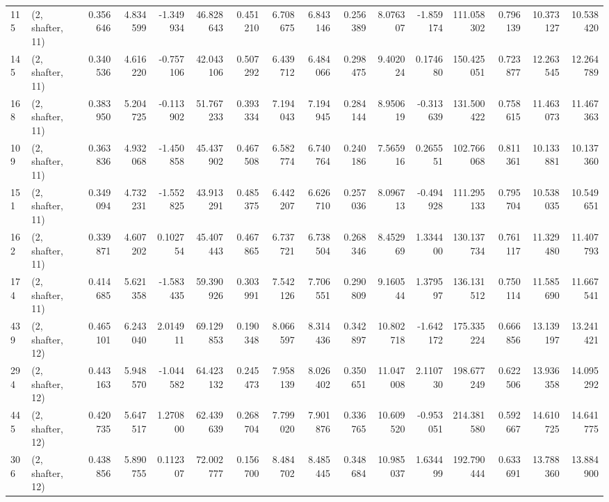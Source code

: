 \begin{tabular}{llrrrrrrrrrrrrrr}
115 &  (2, shafter, 11) &   0.356646 &   4.834599 &  -1.349934 &    46.828643 &   0.451210 &   6.708675 &   6.843146 &  0.256389 &   8.076307 &  -1.859174 &   111.058302 &   0.796139 &  10.373127 &  10.538420 \\
145 &  (2, shafter, 11) &   0.340536 &   4.616220 &  -0.757106 &    42.043106 &   0.507292 &   6.439712 &   6.484066 &  0.298475 &   9.402024 &   0.174680 &   150.425051 &   0.723877 &  12.263545 &  12.264789 \\
168 &  (2, shafter, 11) &   0.383950 &   5.204725 &  -0.113902 &    51.767233 &   0.393334 &   7.194043 &   7.194945 &  0.284144 &   8.950619 &  -0.313639 &   131.500422 &   0.758615 &  11.463073 &  11.467363 \\
109 &  (2, shafter, 11) &   0.363836 &   4.932068 &  -1.450858 &    45.437902 &   0.467508 &   6.582774 &   6.740764 &  0.240186 &   7.565916 &   0.265551 &   102.766068 &   0.811361 &  10.133881 &  10.137360 \\
151 &  (2, shafter, 11) &   0.349094 &   4.732231 &  -1.552825 &    43.913291 &   0.485375 &   6.442207 &   6.626710 &  0.257036 &   8.096713 &  -0.494928 &   111.295133 &   0.795704 &  10.538035 &  10.549651 \\
162 &  (2, shafter, 11) &   0.339871 &   4.607202 &   0.102754 &    45.407443 &   0.467865 &   6.737721 &   6.738504 &  0.268346 &   8.452969 &   1.334400 &   130.137734 &   0.761117 &  11.329480 &  11.407793 \\
174 &  (2, shafter, 11) &   0.414685 &   5.621358 &  -1.583435 &    59.390926 &   0.303991 &   7.542126 &   7.706551 &  0.290809 &   9.160544 &   1.379597 &   136.131512 &   0.750114 &  11.585690 &  11.667541 \\
439 &  (2, shafter, 12) &   0.465101 &   6.243040 &   2.014911 &    69.129853 &   0.190348 &   8.066597 &   8.314436 &  0.342897 &  10.802718 &  -1.642172 &   175.335224 &   0.666856 &  13.139197 &  13.241421 \\
294 &  (2, shafter, 12) &   0.443163 &   5.948570 &  -1.044582 &    64.423132 &   0.245473 &   7.958139 &   8.026402 &  0.350651 &  11.047008 &   2.110730 &   198.677249 &   0.622506 &  13.936358 &  14.095292 \\
445 &  (2, shafter, 12) &   0.420735 &   5.647517 &   1.270800 &    62.439639 &   0.268704 &   7.799020 &   7.901876 &  0.336765 &  10.609520 &  -0.953051 &   214.381580 &   0.592667 &  14.610725 &  14.641775 \\
306 &  (2, shafter, 12) &   0.438856 &   5.890755 &   0.112307 &    72.002777 &   0.156700 &   8.484702 &   8.485445 &  0.348684 &  10.985037 &   1.634499 &   192.790444 &   0.633691 &  13.788360 &  13.884900 \\

\end{tabular}
